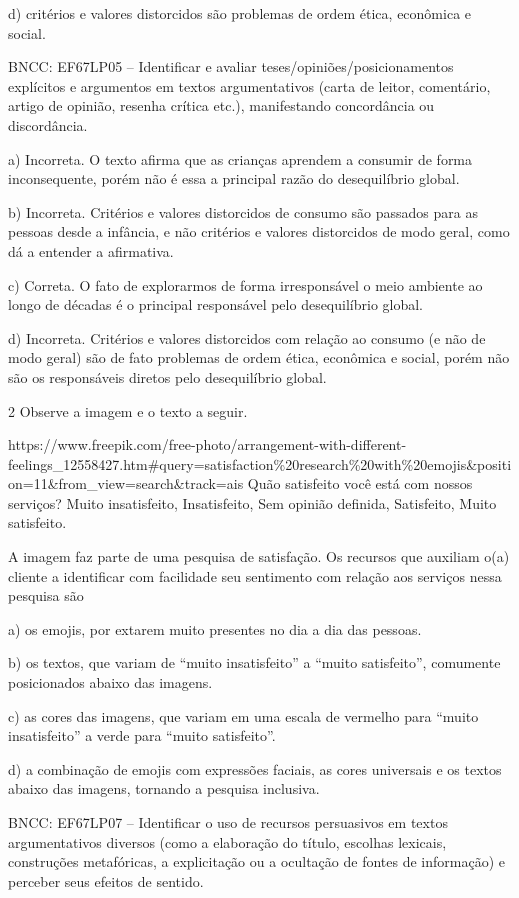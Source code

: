 d) critérios e valores distorcidos são problemas de ordem ética,
econômica e social.

BNCC: EF67LP05 -- Identificar e avaliar teses/opiniões/posicionamentos
explícitos e argumentos em textos argumentativos (carta de leitor,
comentário, artigo de opinião, resenha crítica etc.), manifestando
concordância ou discordância.

a) Incorreta. O texto afirma que as crianças aprendem a consumir de
forma inconsequente, porém não é essa a principal razão do desequilíbrio
global.

b) Incorreta. Critérios e valores distorcidos de consumo são passados
para as pessoas desde a infância, e não critérios e valores distorcidos
de modo geral, como dá a entender a afirmativa.

c) Correta. O fato de explorarmos de forma irresponsável o meio ambiente
ao longo de décadas é o principal responsável pelo desequilíbrio global.

d) Incorreta. Critérios e valores distorcidos com relação ao consumo (e
não de modo geral) são de fato problemas de ordem ética, econômica e
social, porém não são os responsáveis diretos pelo desequilíbrio global.

\num{2} Observe a imagem e o texto a seguir.

https://www.freepik.com/free-photo/arrangement-with-different-feelings\_12558427.htm\#query=satisfaction\%20research\%20with\%20emojis\&position=11\&from\_view=search\&track=ais
Quão satisfeito você está com nossos serviços? Muito insatisfeito,
Insatisfeito, Sem opinião definida, Satisfeito, Muito satisfeito.

A imagem faz parte de uma pesquisa de satisfação. Os recursos que
auxiliam o(a) cliente a identificar com facilidade seu sentimento com
relação aos serviços nessa pesquisa são

a) os emojis, por extarem muito presentes no dia a dia das pessoas.

b) os textos, que variam de ``muito insatisfeito'' a ``muito
satisfeito'', comumente posicionados abaixo das imagens.

c) as cores das imagens, que variam em uma escala de vermelho para
``muito insatisfeito'' a verde para ``muito satisfeito''.

d) a combinação de emojis com expressões faciais, as cores universais e
os textos abaixo das imagens, tornando a pesquisa inclusiva.

BNCC: EF67LP07 -- Identificar o uso de recursos persuasivos em textos
argumentativos diversos (como a elaboração do título, escolhas lexicais,
construções metafóricas, a explicitação ou a ocultação de fontes de
informação) e perceber seus efeitos de sentido.

